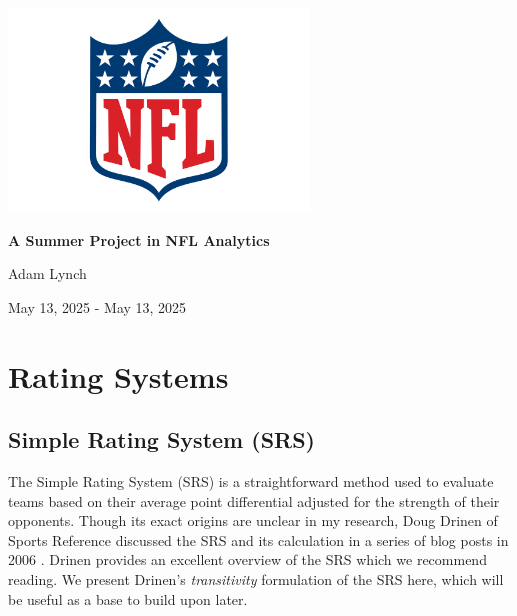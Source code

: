 \documentclass{report}
\begin{document}
\begin{titlepage}
    \centering

    \includegraphics[width=8cm]{images/nfl_logo.png}\par\vspace{1cm}

    \vspace{0.5cm}
    {\huge\bfseries A Summer Project in NFL Analytics \par}
    \vspace{2cm}

    {\Large Adam Lynch \par}
    \vspace{1cm}

    {\large May 13, 2025 - May 13, 2025 \par}

    \vfill
\end{titlepage}

\tableofcontents
\newpage

\chapter{Rating Systems}

\section{Simple Rating System (SRS)}

The Simple Rating System (SRS) is a straightforward method used to evaluate teams based on their average point differential adjusted for the strength of their opponents. 
Though its exact origins are unclear in my research, Doug Drinen of Sports Reference discussed the SRS and its calculation in a series of blog posts in 2006 \cite{drinen06-1,drinen06-2}.
Drinen provides an excellent overview of the SRS which we recommend reading.
We present Drinen's \textit{transitivity} formulation of the SRS here, which will be useful as a base to build upon later.
\end{document}
